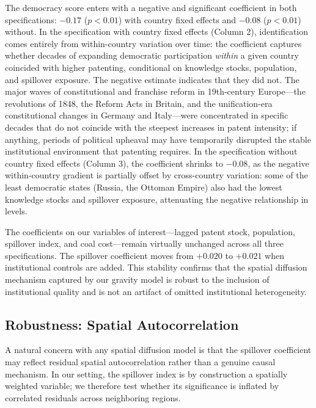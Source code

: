 \documentclass[letterpaper,12pt,leqno]{article}
\begin{document}
The democracy score enters with a negative and significant coefficient in both specifications: \(-0.17\) (\(p < 0.01\)) with country fixed effects and \(-0.08\) (\(p < 0.01\)) without. In the specification with country fixed effects (Column 2), identification comes entirely from within-country variation over time: the coefficient captures whether decades of expanding democratic participation \textit{within} a given country coincided with higher patenting, conditional on knowledge stocks, population, and spillover exposure. The negative estimate indicates that they did not. The major waves of constitutional and franchise reform in 19th-century Europe---the revolutions of 1848, the Reform Acts in Britain, and the unification-era constitutional changes in Germany and Italy---were concentrated in specific decades that do not coincide with the steepest increases in patent intensity; if anything, periods of political upheaval may have temporarily disrupted the stable institutional environment that patenting requires. In the specification without country fixed effects (Column 3), the coefficient shrinks to \(-0.08\), as the negative within-country gradient is partially offset by cross-country variation: some of the least democratic states (Russia, the Ottoman Empire) also had the lowest knowledge stocks and spillover exposure, attenuating the negative relationship in levels.

The coefficients on our variables of interest---lagged patent stock, population, spillover index, and coal cost---remain virtually unchanged across all three specifications. The spillover coefficient moves from \(+0.020\) to \(+0.021\) when institutional controls are added. This stability confirms that the spatial diffusion mechanism captured by our gravity model is robust to the inclusion of institutional quality and is not an artifact of omitted institutional heterogeneity.

\subsection{Robustness: Spatial Autocorrelation}

A natural concern with any spatial diffusion model is that the spillover coefficient may reflect residual spatial autocorrelation rather than a genuine causal mechanism. In our setting, the spillover index is by construction a spatially weighted variable; we therefore test whether its significance is inflated by correlated residuals across neighboring regions.
\end{document}
